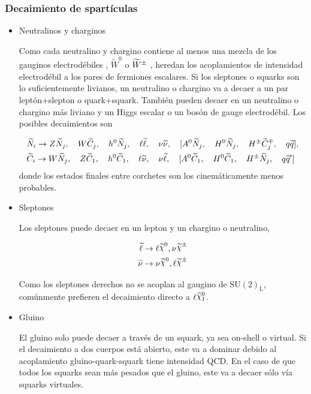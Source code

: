 \subsubsection{Decaimiento de spartículas}

\begin{itemize}\itemsep0.2cm\parskip0.2cm

\item Neutralinos y charginos

Como cada neutralino y chargino contiene al menos una mezcla de los gauginos
electrodébiles {\bino}, $\tilde W^0$ o $\widetilde{W}^{\pm}$ , heredan los
acoplamientos de intensidad electrodébil a los pares de fermiones escalares. Si
los sleptones o squarks son lo suficientemente livianos, un neutralino o
chargino va a decaer a un par leptón+slepton o quark+squark. También pueden
decaer en un neutralino o chargino más liviano y un Higgs escalar o un bosón
de gauge electrodébil. Los posibles decaimientos son

\begin{align*}
  &\widetilde{N}_i \rightarrow Z \widetilde{N}_j, \quad W \widetilde{C}_j, \quad h^0 \widetilde{N}_j, \quad
  \ell \widetilde{\ell}, \quad \nu \widetilde{\nu}, \quad [A^0 \widetilde{N}_j, \quad H^0
    \widetilde{N}_j, \quad H^{\pm} \widetilde{C}_j^{\mp}, \quad q \widetilde{q}],
  \\ &\widetilde{C}_i \rightarrow W \widetilde{N}_j, \quad Z \widetilde{C}_1, \quad h^0 \widetilde{C}_1,
  \quad \ell \widetilde{\nu}, \quad \nu \widetilde{\ell}, \quad [A^0 \widetilde{C}_1, \quad H^0
    \widetilde{C}_1, \quad H^{\pm} \widetilde{N}_j, \quad q \widetilde{q}']
\end{align*}
%
donde los estados finales entre corchetes son los cinemáticamente menos
probables.


\item Sleptones

Los sleptones puede decaer en un lepton y un chargino o neutralino,

\begin{align}
  \slepton &\to \ell \nino, \nu\chinopm \\ \snu &\to \nu\nino, \ell\chinopm
\end{align}

Como los sleptones derechos no se acoplan al gaugino de $\text{SU}(2)_\text{L}$,
comúnmente prefieren el decaimiento directo a $\ell\ninoone$.


\item Gluino

El gluino solo puede decaer a través de un squark, ya sea on-shell o virtual. Si
el decaimiento a dos cuerpos está abierto, este va a dominar debido al
acoplamiento gluino-quark-squark tiene intensidad QCD. En el caso de que todos
los squarks sean más pesados que el gluino, este va a decaer sólo vía squarks
virtuales.


\end{itemize}
